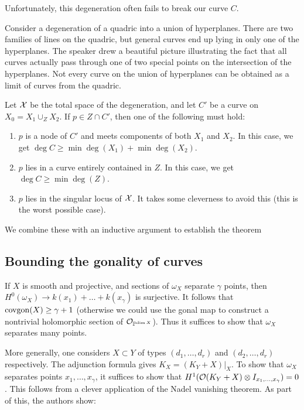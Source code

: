 \documentclass{article}
\begin{document}
Unfortunately, this degeneration often fails to break our curve $C$.

\begin{ex}
	Consider a degeneration of a quadric into a union of hyperplanes.
	There are two families of lines on the quadric, but general curves end up lying in only one of the hyperplanes.
	The speaker drew a beautiful picture illustrating the fact that all curves actually pass through one of two special points on the intersection of the hyperplanes.
	Not every curve on the union of hyperplanes can be obtained as a limit of curves from the quadric.
\end{ex}

Let $\mathcal{X}$ be the total space of the degeneration, and let $C'$ be a curve on $X_0 = X_1 \cup_Z X_2$.
If $p \in Z \cap C'$, then one of the following must hold:
\begin{enumerate}
	\item $p$ is a node of $C'$ and meets components of both $X_1$ and $X_2$.
		In this case, we get $\deg C \geq \min \deg(X_1) + \min \deg(X_2)$.
	\item $p$ lies in a curve entirely contained in $Z$.
		In this case, we get $\deg C \geq \min \deg(Z)$.
	\item $p$ lies in the singular locus of $\mathcal{X}$.
		It takes some cleverness to avoid this (this is the worst possible case).
\end{enumerate}

We combine these with an inductive argument to establish the theorem

\subsection{Bounding the gonality of curves}

If $X$ is smooth and projective, and sections of $\omega_X$ separate $\gamma$ points, then $H^0(\omega_X) \to k(x_1) + \dots + k(x_\gamma)$ is surjective.
It follows that $\operatorname{covgon}(X) \geq \gamma + 1$ (otherwise we could use the gonal map to construct a nontrivial holomorphic section of $\mathcal{O}_{\mathbb{P}^{\dim X}}$).
Thus it suffices to show that $\omega_X$ separates many points.

More generally, one considers $X \subset Y$ of types $(d_1, \dots, d_r)$ and $(d_2, \dots, d_r)$ respectively.
The adjunction formula gives $K_X = (K_Y + X)|_X$.
To show that $\omega_X$ separates points $x_1, \dots, x_\gamma$, it suffices to show that $H^1(\mathcal{O}(K_Y + X) \otimes I_{x_1, \dots, x_\gamma}) = 0$.
This follows from a clever application of the Nadel vanishing theorem.
As part of this, the authors show:
\end{document}
